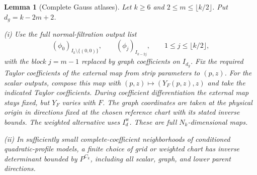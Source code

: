 \documentclass[11pt]{amsart}
\newtheorem{lemma}[theorem]{Lemma}
\theoremstyle{definition}
\theoremstyle{remark}
\numberwithin{equation}{section}
\begin{document}
\begin{lemma}[Complete Gauss atlases]\label{surf:gauss-atlas}
Let $k\ge6$ and $2\le m\le\lfloor k/2\rfloor$. Put $d_g=k-2m+2$.

\noindent\textup{(i)} Use the full normal-filtration output list
\[
 (\phi_0)_{I_k\setminus\{(0,0)\}},\qquad (\phi_j)_{I_{k-2j}},\qquad 1\le j\le\lfloor k/2\rfloor,
\]
with the block $j=m-1$ replaced by graph coefficients on $I_{d_g}$. Fix the required Taylor coefficients of the external map from strip parameters to $(p,z)$. For the scalar outputs, compose this map with $(p,z)\mapsto(Y_F(p,z),z)$ and take the indicated Taylor coefficients. During coefficient differentiation the external map stays fixed, but $Y_F$ varies with $F$. The graph coordinates are taken at the physical origin in directions fixed at the chosen reference chart with its stated inverse bounds. The weighted alternative uses $I_d^{\mathrm w}$. These are full $N_k$-dimensional maps.

\noindent\textup{(ii)} In sufficiently small complete-coefficient neighborhoods of conditioned quadratic-profile models, a finite choice of grid or weighted chart has inverse determinant bounded by $P^{C_k}$, including all scalar, graph, and lower parent directions.
\end{lemma}
\end{document}
